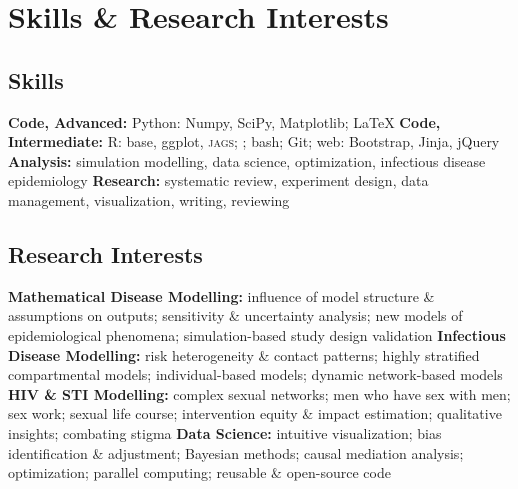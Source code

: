 \section{Skills \& Research Interests}\nodate
\subsection{Skills}
\bullet \textbf{Code, Advanced:} Python: Numpy, SciPy, Matplotlib; \LaTeX
\bullet \textbf{Code, Intermediate:} R: base, ggplot, \textsc{jags}; \matlab; bash; Git; web: Bootstrap, Jinja, jQuery
\bullet \textbf{Analysis:} simulation modelling, data science, optimization, infectious disease epidemiology
\bullet \textbf{Research:} systematic review, experiment design, data management, visualization, writing, reviewing
\subsection{Research Interests}\nodate
\bullet \textbf{Mathematical Disease Modelling:}
        influence of model structure \& assumptions on outputs;
        sensitivity \& uncertainty analysis;
        new models of epidemiological phenomena;
        simulation-based study design validation
\bullet \textbf{Infectious Disease Modelling:}
        risk heterogeneity \& contact patterns;
        highly stratified compartmental models;
        individual-based models;
        dynamic network-based models
\bullet \textbf{HIV \& STI Modelling:}
        complex sexual networks;
        men who have sex with men;
        sex work;
        sexual life course;
        intervention equity \& impact estimation;
        qualitative insights;
        combating stigma
\bullet \textbf{Data Science:}
        intuitive visualization;
        bias identification \& adjustment;
        Bayesian methods;
        causal mediation analysis;
        optimization;
        parallel computing;
        reusable \& open-source code
